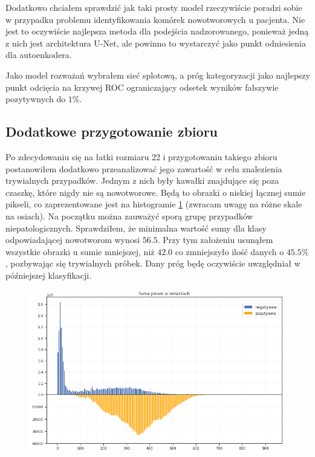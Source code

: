 Dodatkowo chciałem sprawdzić jak taki prosty model rzeczywiście poradzi sobie w przypadku problemu identyfikowania komórek nowotworowych u pacjenta. Nie jest to oczywiście najlepsza metoda dla podejścia nadzorowanego, ponieważ jedną z nich jest architektura U-Net, ale powinno to wystarczyć jako punkt odniesienia dla autoenkodera.

Jako model rozważań wybrałem sieć splotową, a próg kategoryzacji jako najlepszy punkt odcięcia na krzywej ROC ograniczający odsetek wyników fałszywie pozytywnych do $1\%$.

\subsection{Dodatkowe przygotowanie zbioru}

Po zdecydowaniu się na łatki rozmiaru 22 i przygotowaniu takiego zbioru postanowiłem dodatkowo przeanalizować jego zawartość w celu znalezienia trywialnych przypadków. Jednym z nich były kawałki znajdujące się poza czaszkę, które nigdy nie są nowotworowe. Będą to obrazki o niskiej łącznej sumie pikseli, co zaprezentowane jest na histogramie \ref{fig:pixel_sums} (zwracam uwagę na różne skale na osiach). Na początku można zauważyć sporą grupę przypadków niepatologicznych. Sprawdziłem, że minimalna wartość sumy dla klasy odpowiadającej nowotworom wynosi $56.5$. Przy tym założeniu usunąłem wszystkie obrazki u sumie mniejszej, niż $42.0$ co zmniejszyło ilość danych o $45.5\%$, pozbywając się trywialnych próbek. Dany próg będę oczywiście uwzględniał w późniejszej klasyfikacji.

\begin{figure}[h!]
    \centering
    \includegraphics[width=1.0\textwidth]{images/pixel_sums_v2}
    \caption{}
    \label{fig:pixel_sums}
\end{figure}
